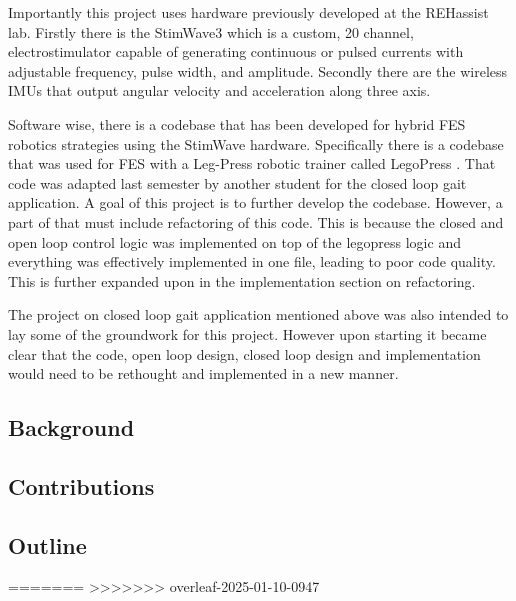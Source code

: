 Importantly this project uses hardware previously developed at the REHassist lab. Firstly there is the StimWave3 which is a custom, 20 channel, electrostimulator capable of generating continuous or pulsed currents with adjustable frequency, pulse width, and amplitude. Secondly there are the wireless IMUs that output angular velocity and acceleration along three axis. 

Software wise, there is a codebase that has been developed for hybrid FES robotics strategies using the StimWave hardware. Specifically there is a codebase that was used for FES with a Leg-Press robotic trainer called LegoPress \cite{olivier_legopress_2014}. That code was adapted last semester by another student for the closed loop gait application. A goal of this project is to further develop the codebase. However, a part of that must include refactoring of this code. This is because the closed and open loop control logic was implemented on top of the legopress logic and everything was effectively implemented in one file, leading to poor code quality. This is further expanded upon in the implementation section on refactoring.

The project on closed loop gait application mentioned above was also intended to lay some of the groundwork for this project. However upon starting it became clear that the code, open loop design, closed loop design and implementation would need to be rethought and implemented in a new manner.

\subsection{Background}

\subsection{Contributions}

\subsection{Outline}



=======
>>>>>>> overleaf-2025-01-10-0947

